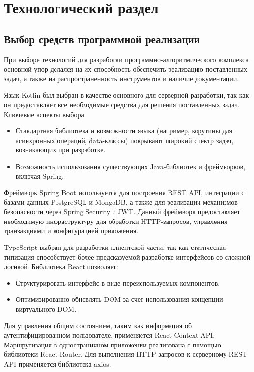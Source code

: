 \chapter{Технологический раздел}

\section{Выбор средств программной реализации}

При выборе технологий для разработки программно-алгоритмического комплекса основной упор делался на их способность обеспечить реализацию поставленных задач, а также на распространенность инструментов и наличие документации.

Язык Kotlin был выбран в качестве основного для серверной разработки, так как он предоставляет все необходимые средства для решения поставленных задач. 
Ключевые аспекты выбора:
\begin{itemize}
    \item Стандартная библиотека и возможности языка (например, корутины для асинхронных операций, data-классы) покрывают широкий спектр задач, возникающих при разработке.
    \item Возможность использования существующих Java-библиотек и фреймворков, включая Spring.
\end{itemize}

Фреймворк Spring Boot используется для построения REST API, интеграции с базами данных PostgreSQL и MongoDB, а также для реализации механизмов безопасности через Spring Security с JWT. 
Данный фреймворк предоставляет необходимую инфраструктуру для обработки HTTP-запросов, управления транзакциями и конфигурацией приложения.

TypeScript выбран для разработки клиентской части, так как статическая типизация способствует более предсказуемой разработке интерфейсов со сложной логикой. 
Библиотека React позволяет:
\begin{itemize}
    \item Структурировать интерфейс в виде переиспользуемых компонентов.
    \item Оптимизированно обновлять DOM за счет использования концепции виртуального DOM.
\end{itemize}

Для управления общим состоянием, таким как информация об аутентифицированном пользователе, применяется React Context API. 
Маршрутизация в одностраничном приложении реализована с помощью библиотеки React Router.
Для выполнения HTTP-запросов к серверному REST API применяется библиотека axios.

